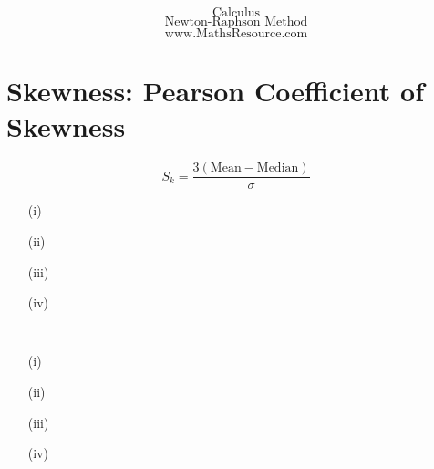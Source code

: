 
\usepackage{amsmath}
\usepackage{amssymb}
\usepackage{graphics}


\begin{frame}


{
\huge
\[ \mbox{Calculus} \]
\[ \mbox{Newton-Raphson Method} \]
}
{
\Large
\[ \mbox{www.MathsResource.com} \]
}
\end{frame}%







\section{Skewness: Pearson Coefficient of Skewness}


\[S_k = \frac{3(\mbox{Mean} - \mbox{Median} )}{\sigma} \]



\begin{itemize}

\item[(i)]

\item[(ii)]

\item[(iii)]

\item[(iv)]

\end{itemize}

\begin{framed}
\begin{verbatim}


\end{verbatim}
\end{framed}
\newpage
\begin{itemize}

\item[(i)]

\item[(ii)]

\item[(iii)]

\item[(iv)]

\end{itemize}

\begin{framed}
\begin{verbatim}

\end{verbatim}
\end{framed}

